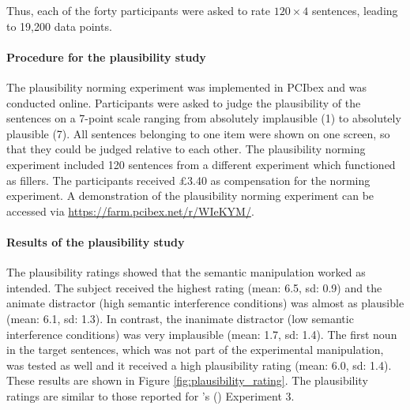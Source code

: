 \documentclass[a4paper, man, floatsintext]{apa7}
\begin{document}
Thus, each of the forty participants were asked to rate $120 \times 4$ sentences, leading to 19,200 data points.

\paragraph{Procedure for the plausibility study}
The plausibility norming experiment was implemented in PCIbex \citep{pcibex} and was conducted online. Participants were asked to judge the plausibility of the sentences on a 7-point scale ranging from absolutely implausible (1) to absolutely plausible (7). All sentences belonging to one item were shown on one screen, so that they could be judged relative to each other. The plausibility norming experiment included 120 sentences from a different experiment which functioned as fillers. The participants received \pounds 3.40 as compensation for the norming experiment. A demonstration of the plausibility norming experiment can be accessed via \hyperlink{https://farm.pcibex.net/r/WIeKYM/}{https://farm.pcibex.net/r/WIeKYM/}.

\paragraph{Results of the plausibility study}
The plausibility ratings showed that the semantic manipulation worked as intended. The subject received the highest rating (mean: 6.5, sd: 0.9) and the animate distractor (high semantic interference conditions) was almost as plausible (mean: 6.1, sd: 1.3). In contrast, the inanimate distractor (low semantic interference conditions) was very implausible (mean: 1.7, sd: 1.4). The first noun in the target sentences, which was not part of the experimental manipulation, was tested as well and it received a high plausibility rating (mean: 6.0, sd: 1.4). These results are shown in Figure \ref{fig:plausibility_rating}. The plausibility ratings are similar to those reported for \citeauthor{vandyke07}'s (\citeyear{vandyke07}) Experiment 3.
\end{document}
